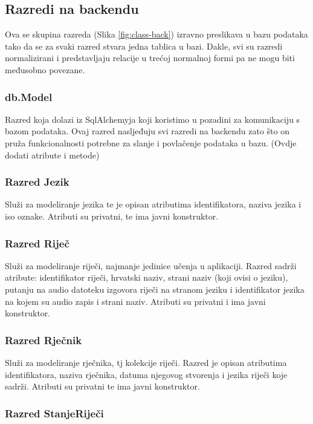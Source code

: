 \subsection{Razredi na backendu}

Ova se skupina razreda (Slika \ref{fig:class-back}) izravno preslikava u bazu podataka tako da se za svaki razred stvara jedna tablica u bazi. Dakle, svi su razredi normalizirani i predstavljaju relacije u trećoj normalnoj formi pa ne mogu biti međusobno povezane.

\subsubsection{db.Model}

Razred koja dolazi iz SqlAlchemyja koji koristimo u pozadini za komunikaciju s 
bazom podataka. Ovaj razred nasljeđuju svi razredi na backendu zato što on
pruža funkcionalnosti potrebne za slanje i povlačenje podataka u bazu.
(Ovdje dodati atribute i metode)


\subsubsection{Razred Jezik}

Služi za modeliranje jezika te je opisan atributima identifikatora,
naziva jezika i iso oznake. Atributi su privatni, te ima javni konstruktor.

\subsubsection{Razred Riječ}

Služi za modeliranje riječi, najmanje jedinice učenja u aplikaciji.
Razred sadrži atribute: identifikator riječi, hrvatski naziv, strani naziv (koji ovisi o jeziku),
putanju na audio datoteku izgovora riječi na stranom jeziku i identifikator jezika
na kojem su audio zapis i strani naziv. Atributi su privatni i ima javni konstruktor.

\subsubsection{Razred Rječnik}

Služi za modeliranje rječnika, tj kolekcije riječi. Razred je opisan atributima identifikatora, naziva rječnika, datuma njegovog stvorenja i jezika riječi koje sadrži. Atributi su privatni te ima javni konstruktor.

\subsubsection{Razred StanjeRiječi}

